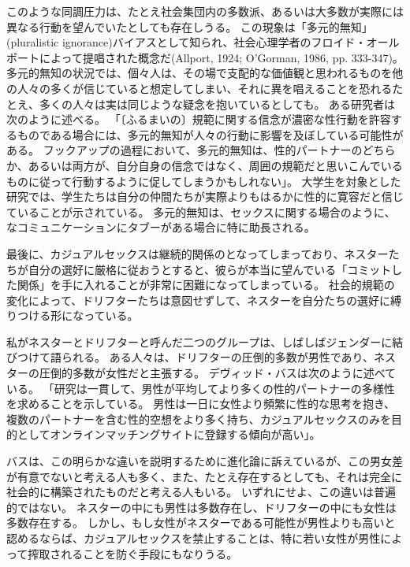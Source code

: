 \documentclass[paper=a4,book,openany]{jlreq} \usepackage{mystyle}
\begin{document}
このような同調圧力は、たとえ社会集団内の多数派、あるいは大多数が実際には異なる行動を望んでいたとしても存在しうる。
この現象は「多元的無知」(pluralistic ignorance)バイアスとして知られ、社会心理学者のフロイド・オールポートによって提唱された概念だ(Allport, 1924; O'Gorman, 1986, pp. 333-347)。
\nocite{allport24:_social_psyc,ogorman86:_disc_plur_ignor}多元的無知の状況では、個々人は、その場で支配的な価値観と思われるものを他の人々の多くが信じていると想定してしまい、それに異を唱えることを恐れる{\DDASH}たとえ、多くの人々は実は同じような疑念を抱いているとしても。
ある研究者は次のように述べる。
「〔ふるまいの〕規範に関する信念が濃密な性行動を許容するものである場合には、多元的無知が人々の行動に影響を及ぼしている可能性がある。
フックアップの過程において、多元的無知は、性的パートナーのどちらか、あるいは両方が、自分自身の信念ではなく、周囲の規範だと思いこんでいるものに従って行動するように促してしまうかもしれない」\citep[p. 130]{griggs03:_plur_ignor_hook_up}。
大学生を対象とした研究では、学生たちは自分の仲間たちが実際よりもはるかに性的に寛容だと信じていることが示されている\citep{chia06:_how_media_cont,reiber10:_hook_up}。
多元的無知は、セックスに関する場合のように、なコミュニケーションにタブーがある場合に特に助長される。

最後に、カジュアルセックスは継続的関係のとなってしまっており、ネスターたちが自分の選好に厳格に従おうとすると、彼らが本当に望んでいる「コミットした関係」を手に入れることが非常に困難になってしまっている。
社会的規範の変化によって、ドリフターたちは意図せずして、ネスターを自分たちの選好に縛りつける形になっている。

私がネスターとドリフターと呼んだ二つのグループは、しばしばジェンダーに結びつけて語られる。
ある人々は、ドリフターの圧倒的多数が男性であり、ネスターの圧倒的多数が女性だと主張する\citep[cf.][]{regnerus12:_cont_matin_mark}。
デヴィッド・バスは次のように述べている。
「研究は一貫して、男性が平均してより多くの性的パートナーの多様性を求めることを示している。
男性は一日に女性より頻繁に性的な思考を抱き、複数のパートナーを含む性的空想をより多く持ち、カジュアルセックスのみを目的としてオンラインマッチングサイトに登録する傾向が高い」\citep{buss16:_what_do_you}。

バスは、この明らかな違いを説明するために進化論に訴えているが、この男女差が有意でないと考える人も多く、また、たとえ存在するとしても、それは完全に社会的に構築されたものだと考える人もいる。
いずれにせよ、この違いは普遍的ではない。
ネスターの中にも男性は多数存在し、ドリフターの中にも女性は多数存在する。
しかし、もし女性がネスターである可能性が男性よりも高いと認めるならば、カジュアルセックスを禁止することは、特に若い女性が男性によって搾取されることを防ぐ手段にもなりうる。
\end{document}
